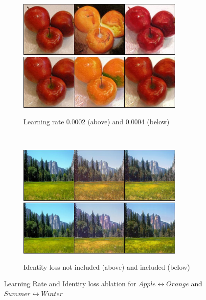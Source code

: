 \documentclass[10pt,twocolumn,letterpaper]{article}
\begin{document}
\begin{figure}[!htb]
     \centering
     \begin{subfigure}[]{0.49\textwidth}
         \centering
         \includegraphics[width=0.9\textwidth]{test_a_2_b_33_i}\\
         \vspace{0.3cm}
		 \includegraphics[width=0.9\textwidth]{test_a_2_b_33}\\
		 \caption{Learning rate 0.0002 (above) and 0.0004 (below)}
         \label{fig:a2r_lr}
     \end{subfigure}
     ~
     \begin{subfigure}[]{0.49\textwidth}
         \centering
         \includegraphics[width=0.9\textwidth]{test_a_2_b_48}\\
         \vspace{0.3cm}
		 \includegraphics[width=0.9\textwidth]{test_a_2_b_48_g}\\
		 \caption{Identity loss not included (above) and included (below)}
         \label{fig:s2w_id}
     \end{subfigure}

     \caption{Learning Rate and Identity loss ablation for $Apple \leftrightarrow Orange$ and $Summer \leftrightarrow Winter$}
     \label{fig:ablation1}
\end{figure} 
\end{document}
